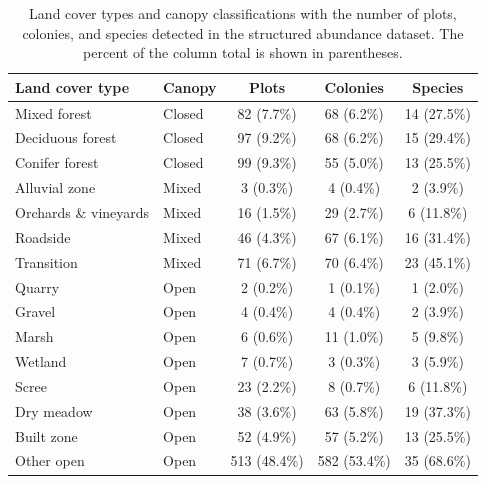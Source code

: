 \documentclass[preprint,final,times,12pt,3p]{elsarticle}
\begin{document}
\begin{table}[ht]
	\centering
	\begin{tabular}{ l l c c c}
		\hline
		\textbf{Land cover type} & \textbf{Canopy} & \textbf{Plots} & \textbf{Colonies} & \textbf{Species} \\
		\hline
		Mixed forest & Closed & 82 (7.7\%) & 68 (6.2\%) & 14 (27.5\%) \\
		Deciduous forest & Closed & 97 (9.2\%) & 68 (6.2\%) & 15 (29.4\%) \\
		Conifer forest & Closed & 99 (9.3\%) & 55 (5.0\%) & 13 (25.5\%) \\
		Alluvial zone & Mixed & 3 (0.3\%) & 4 (0.4\%) & 2 (3.9\%) \\
		Orchards \& vineyards & Mixed & 16 (1.5\%) & 29 (2.7\%) & 6 (11.8\%) \\
		Roadside & Mixed & 46 (4.3\%) & 67 (6.1\%) & 16 (31.4\%) \\
		Transition & Mixed & 71 (6.7\%) & 70 (6.4\%) & 23 (45.1\%) \\
		Quarry & Open & 2 (0.2\%) & 1 (0.1\%) & 1 (2.0\%) \\
		Gravel & Open & 4 (0.4\%) & 4 (0.4\%) & 2 (3.9\%) \\
		Marsh & Open & 6 (0.6\%) & 11 (1.0\%) & 5 (9.8\%) \\
		Wetland & Open & 7 (0.7\%) & 3 (0.3\%) & 3 (5.9\%) \\
		Scree & Open & 23 (2.2\%) & 8 (0.7\%) & 6 (11.8\%) \\
		Dry meadow & Open & 38 (3.6\%) & 63 (5.8\%) & 19 (37.3\%) \\
		Built zone & Open & 52 (4.9\%) & 57 (5.2\%) & 13 (25.5\%) \\
		Other open & Open & 513 (48.4\%) & 582 (53.4\%) & 35 (68.6\%) \\
	\end{tabular}
	\caption{\label{table:landcover} Land cover types and canopy classifications with the number of plots, colonies, and species detected in the structured abundance dataset. The percent of the column total is shown in parentheses. }
\end{table}



\newpage
\end{document}
